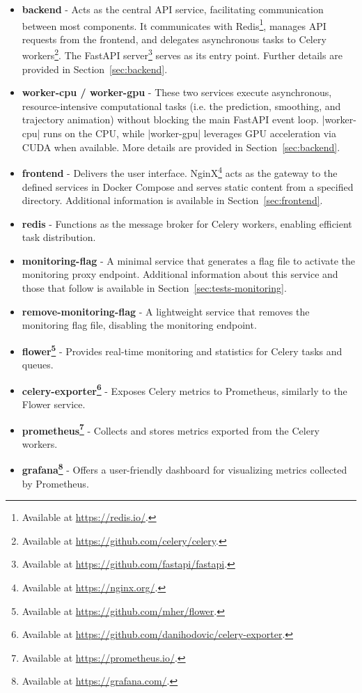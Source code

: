 \begin{itemize}
    \item \textbf{backend} - Acts as the central API service, facilitating communication between most components. It communicates with Redis\footnote{Available at \url{https://redis.io/}.}, manages API requests from the frontend, and delegates asynchronous tasks to Celery workers\footnote{Available at \url{https://github.com/celery/celery}.}. The FastAPI server\footnote{Available at \url{https://github.com/fastapi/fastapi}.} serves as its entry point. Further details are provided in Section~\ref{sec:backend}.
    \item \textbf{worker-cpu / worker-gpu} - These two services execute asynchronous, resource-intensive computational tasks (i.e. the prediction, smoothing, and trajectory animation) without blocking the main FastAPI event loop. \inline|worker-cpu| runs on the CPU, while \inline|worker-gpu| leverages GPU acceleration via CUDA when available. More details are provided in Section~\ref{sec:backend}.
    \item \textbf{frontend} - Delivers the user interface. NginX\footnote{Available at \url{https://nginx.org/}.} acts as the gateway to the defined services in Docker Compose and serves static content from a specified directory. Additional information is available in Section~\ref{sec:frontend}.
    \item \textbf{redis} - Functions as the message broker for Celery workers, enabling efficient task distribution.
    \item \textbf{monitoring-flag} - A minimal service that generates a flag file to activate the monitoring proxy endpoint. Additional information about this service and those that follow is available in Section~\ref{sec:tests-monitoring}.
    \item \textbf{remove-monitoring-flag} - A lightweight service that removes the monitoring flag file, disabling the monitoring endpoint.
    \item \textbf{flower\footnote{Available at \url{https://github.com/mher/flower}.}} - Provides real-time monitoring and statistics for Celery tasks and queues.
    \item \textbf{celery-exporter\footnote{Available at \url{https://github.com/danihodovic/celery-exporter}.}} - Exposes Celery metrics to Prometheus, similarly to the Flower service.
    \item \textbf{prometheus\footnote{Available at \url{https://prometheus.io/}.}} - Collects and stores metrics exported from the Celery workers.
    \item \textbf{grafana\footnote{Available at \url{https://grafana.com/}.}} - Offers a user-friendly dashboard for visualizing metrics collected by Prometheus.
\end{itemize}

